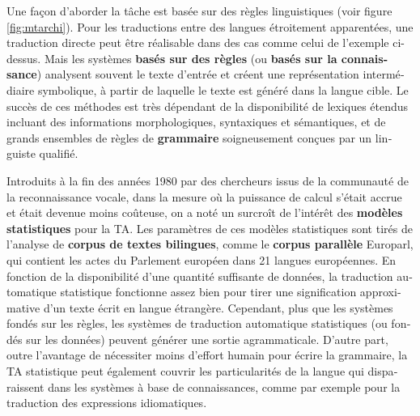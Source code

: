 \begin{french}
\begin{multicols}{2}
Une façon d'aborder la tâche est basée sur des règles
linguistiques (voir figure \ref{fig:mtarchi}). Pour les traductions entre des langues étroitement
apparentées, une traduction directe peut être réalisable dans des cas
comme celui de l'exemple ci-dessus. Mais les systèmes {\bf basés sur  des
règles} (ou {\bf basés sur la connaissance}) analysent souvent le texte
d'entrée et créent une représentation intermédiaire symbolique, à
partir de laquelle le texte est généré dans la langue cible.  Le
succès de ces méthodes est très dépendant de la disponibilité de
lexiques étendus incluant des informations morphologiques, syntaxiques
et sémantiques, et de grands ensembles de règles de {\bf grammaire}
soigneusement conçues par un linguiste qualifié.

Introduits à la fin des années 1980 par des chercheurs issus de la
communauté de la reconnaissance vocale, dans la mesure où la puissance
de calcul s'était accrue et était devenue moins coûteuse, on a noté un
surcroît de l'intérêt des {\bf modèles statistiques} pour la TA. Les
paramètres de ces modèles statistiques sont tirés de l'analyse de
{\bf corpus de textes bilingues}, comme le {\bf corpus parallèle} Europarl, qui
contient les actes du Parlement européen dans 21 langues
européennes. En fonction de la disponibilité d'une quantité suffisante
de données, la traduction automatique statistique fonctionne assez bien pour tirer une
signification approximative d'un texte écrit en langue
étrangère. Cependant, plus que les systèmes fondés sur les règles, les
systèmes de traduction automatique statistiques (ou fondés sur les données) peuvent
générer une sortie agrammaticale. D'autre part, outre l'avantage de
nécessiter moins d'effort humain pour écrire la grammaire, la TA
statistique peut également couvrir les particularités de la langue qui
disparaissent dans les systèmes à base de connaissances, comme par
exemple pour la traduction des expressions idiomatiques.


\end{multicols}
\end{french}

